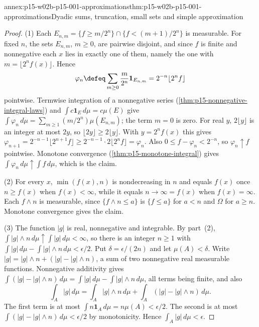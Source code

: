 \begin{annexitem}{annex:p15-w02b-p15-001-approximations}{thm:p15-w02b-p15-001-approximations}{Dyadic sums, truncation, small sets and simple approximation}
\begin{proof}
(1) Each \(E_{n,m}=\{f\geq m/2^n\}\cap\{f<(m+1)/2^n\}\) is measurable.
For fixed \(n\), the sets \(E_{n,m}\), \(m\geq0\), are pairwise
disjoint, and since \(f\) is finite and nonnegative each \(x\) lies in
exactly one of them, namely the one with
\(m=\lfloor2^nf(x)\rfloor\). Hence
\[
 \varphi_n\defeq\sum_{m\geq0}\frac m{2^n}\mathbf1_{E_{n,m}}
 =2^{-n}\lfloor2^nf\rfloor
\]
pointwise. Termwise integration of a nonnegative series
(\cref{thm:p15-nonnegative-integral-laws}) and
\(\int c\mathbf1_E\,d\mu=c\mu(E)\) give
\(\int\varphi_n\,d\mu=\sum_{m\geq1}(m/2^n)\mu(E_{n,m})\); the term
\(m=0\) is zero. For real \(y\), \(2\lfloor y\rfloor\) is an integer at
most \(2y\), so \(\lfloor2y\rfloor\geq2\lfloor y\rfloor\). With
\(y=2^nf(x)\) this gives
\(\varphi_{n+1}=2^{-n-1}\lfloor2^{n+1}f\rfloor\geq
 2^{-n-1}\cdot2\lfloor2^nf\rfloor=\varphi_n\). Also
\(0\leq f-\varphi_n<2^{-n}\), so \(\varphi_n\uparrow f\) pointwise.
Monotone convergence (\cref{thm:p15-monotone-integral}) gives
\(\int\varphi_n\,d\mu\uparrow\int f\,d\mu\), which is the claim.

(2) For every \(x\), \(\min(f(x),n)\) is nondecreasing in \(n\) and
equals \(f(x)\) once \(n\geq f(x)\) when \(f(x)<\infty\), while it
equals \(n\to\infty=f(x)\) when \(f(x)=\infty\). Each \(f\wedge n\) is
measurable, since \(\{f\wedge n\leq a\}\) is \(\{f\leq a\}\) for
\(a<n\) and \(\Omega\) for \(a\geq n\). Monotone convergence gives the
claim.

(3) The function \(|g|\) is real, nonnegative and integrable. By
part~(2), \(\int|g|\wedge n\,d\mu\uparrow\int|g|\,d\mu<\infty\), so
there is an integer \(n\geq1\) with
\(\int|g|\,d\mu-\int|g|\wedge n\,d\mu<\epsilon/2\). Put
\(\delta=\epsilon/(2n)\) and let \(\mu(A)<\delta\). Write
\(|g|=|g|\wedge n+(|g|-|g|\wedge n)\), a sum of two nonnegative real
measurable functions. Nonnegative additivity gives
\(\int(|g|-|g|\wedge n)\,d\mu=\int|g|\,d\mu-\int|g|\wedge n\,d\mu\),
all terms being finite, and also
\[
 \int_A|g|\,d\mu=\int_A|g|\wedge n\,d\mu+\int_A(|g|-|g|\wedge n)\,d\mu.
\]
The first term is at most \(\int n\mathbf1_A\,d\mu=n\mu(A)<\epsilon/2\).
The second is at most \(\int(|g|-|g|\wedge n)\,d\mu<\epsilon/2\) by
monotonicity. Hence \(\int_A|g|\,d\mu<\epsilon\).


\end{proof}
\end{annexitem}

